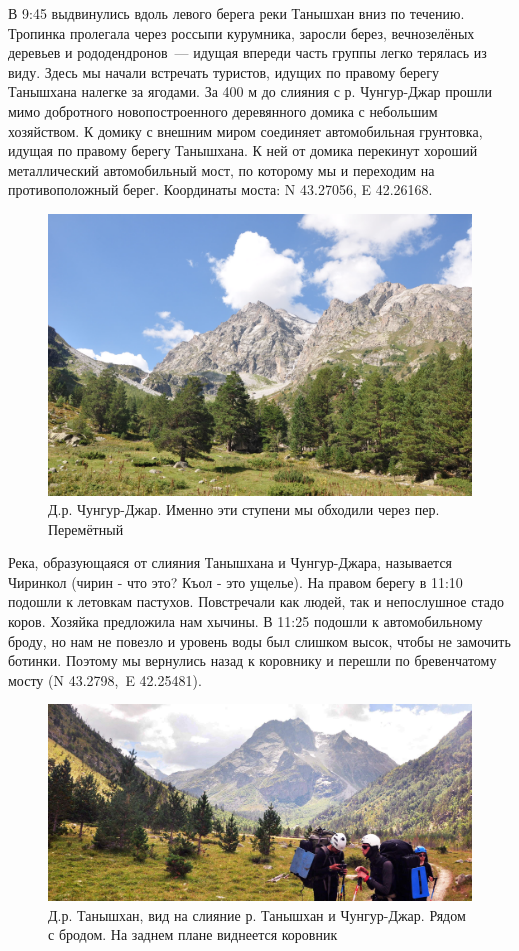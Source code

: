 В 9:45 выдвинулись вдоль левого берега реки Танышхан вниз по течению. Тропинка пролегала через россыпи курумника, заросли берез, вечнозелёных деревьев  и рододендронов~--- идущая впереди часть группы легко терялась из виду. Здесь мы начали встречать туристов, идущих по правому берегу Танышхана налегке за ягодами. За 400 м до слияния с р. Чунгур-Джар прошли мимо добротного новопостроенного деревянного домика с небольшим хозяйством. К домику с внешним миром соединяет автомобильная грунтовка, идущая по правому берегу Танышхана. К ней от домика перекинут хороший металлический автомобильный мост, по которому мы и переходим на противоположный берег. Координаты моста: N 43.27056\degree, E 42.26168\degree. 
 
\begin{figure}[h!]
	\centering
	\includegraphics[width=0.7\linewidth]{../pics/DSC_0459 2}
	\caption{Д.р. Чунгур-Джар. Именно эти ступени мы обходили через пер. Перемётный}
	\label{fig:DSC_0459}
\end{figure}

Река, образующаяся от слияния Танышхана и Чунгур-Джара, называется Чиринкол (чирин - что это? Къол - это ущелье). На правом берегу в 11:10 подошли к летовкам пастухов. Повстречали как людей, так и непослушное стадо коров. Хозяйка предложила нам хычины. В 11:25 подошли к автомобильному броду, но нам не повезло и уровень воды был слишком высок, чтобы не замочить ботинки. Поэтому мы вернулись назад к коровнику и перешли по бревенчатому мосту (N 43.2798\degree,~E 42.25481\degree).

\begin{figure}[h!]
	\centering
	\includegraphics[width=0.7\linewidth]{../pics/DSC_0462 2}
	\caption{Д.р. Танышхан, вид на слияние р. Танышхан и Чунгур-Джар. Рядом с бродом. На заднем плане виднеется коровник}
	\label{fig:DSC_0462}
\end{figure}

